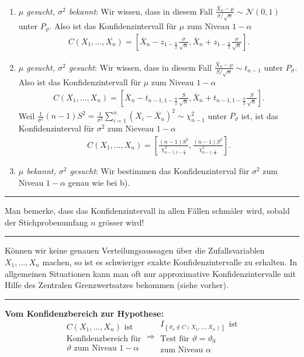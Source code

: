 \documentclass[a4paper, 12pt]{extarticle}
\newcommand{\sep}{\vspace{5pt}\noindent\hrule\vspace{5pt}}
\newcommand{\cN}{\mathcal{N}}
\newcommand{\set}[1]{\left\{ #1 \right\}}
\begin{document}
\begin{multicols*}{2}
\begin{enumerate}[label=\alph*)]
  \item \emph{$\mu$ gesucht, $\sigma^2$ bekannt}: Wir wissen, dass in diesem
  Fall $\frac{\overline{X}_n-\mu}{\sigma/\sqrt{n}}\sim \cN(0,1)$ unter
  $P_\vartheta$. Also ist das Konfidenzintervall für $\mu$ zum Niveau $1-\alpha$
  \begin{gather*}
  C(X_1,\ldots,X_n)=\left[
  \overline{X}_n-z_{1-\frac{\alpha}{2}}\frac{\sigma}{\sqrt{n}},
  \overline{X}_n+z_{1-\frac{\alpha}{2}}\frac{\sigma}{\sqrt{n}}
  \right].
  \end{gather*}
  \item \emph{$\mu$ gesucht, $\sigma^2$ gesucht}: Wir wissen, dass in diesem
  Fall $\frac{\overline{X}_n-\mu}{S/\sqrt{n}}\sim t_{n-1}$ unter $P_\vartheta$.
  Also ist das Konfidenzintervall für $\mu$ zum Niveau $1-\alpha$
  \begin{gather*}
  C(X_1,\ldots,X_n)=\left[
  \overline{X}_n-t_{n-1,1-\frac{\alpha}{2}}\frac{S}{\sqrt{n}},
  \overline{X}_n+t_{n-1,1-\frac{\alpha}{2}}\frac{S}{\sqrt{n}}
  \right].
  \end{gather*}
  Weil $\frac{1}{\sigma^2}(n-1)S^2=\frac{1}{\sigma^2}\sum_{i=1}^n
  (X_i-\overline{X}_n)^2\sim\chi_{n-1}^2$ unter $P_\vartheta$ ist, ist das
  Konfidenzinterval für $\sigma^2$ zum Nieveau $1-\alpha$
  \begin{gather*}
  C(X_1,\ldots,X_n)=\left[
  \frac{(n-1)S^2}{\chi^2_{n-1,1-\frac{\alpha}{2}}},
  \frac{(n-1)S^2}{\chi^2_{n-1,\frac{\alpha}{2}}}
  \right].
  \end{gather*}
  \item \emph{$\mu$ bekannt, $\sigma^2$ gesucht}: Wir bestimmen das
  Konfidenzinterval für $\sigma^2$ zum Niveau $1-\alpha$ genau wie bei b).
\end{enumerate}

\sep

\Important Man bemerke, dass das Konfidenzintervall in allen Fällen schmäler
wird, sobald der Stichprobenumfang $n$ grösser wird!

\sep

\Com Können wir keine genauen Verteilungsaussagen über die Zufallsvariablen
$X_1,\ldots,X_n$ machen, so ist es schwieriger exakte Konfidenzintervalle zu
erhalten. In allgemeinen Situationen kann man oft nur approximative
Konfidenzintervalle mit Hilfe des Zentralen Grenzwertsatzes bekommen (siehe
vorher).
\sep

\textbf{Vom Konfidenzbereich zur Hypothese:}
\[
\begin{matrix}
C(X_1,\ldots,X_n)\text{ ist}\\
\text{Konfidenzbereich für}\\
\vartheta \text{ zum Niveau } 1-\alpha
\end{matrix}
\Longrightarrow
\begin{matrix}
I_{\set{\vartheta_o\not\in C(X_1,\ldots,X_n)}} \text{ ist}\\
\text{Test für }\vartheta=\vartheta_0\\
\text{zum Niveau }\alpha
\end{matrix}
\]


\end{multicols*}
\end{document}
